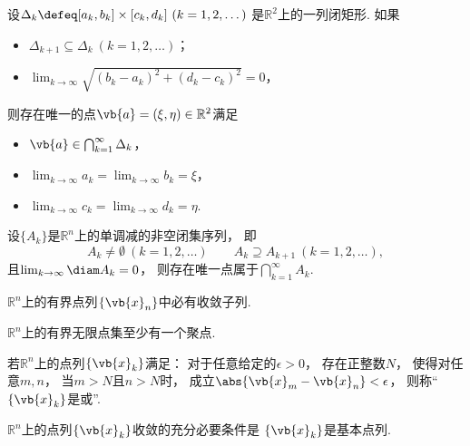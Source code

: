 \begin{theorem}[闭矩形套定理]
设\(\Delta_k \defeq [a_k,b_k]\times[c_k,d_k]\ (k=1,2,\dotsc)\)
是\(\mathbb{R}^2\)上的一列闭矩形.
如果\begin{itemize}
	\item \(\Delta_{k+1} \subseteq \Delta_k\ (k=1,2,\dotsc)\)；
	\item \(\lim_{k\to\infty} \sqrt{(b_k-a_k)^2+(d_k-c_k)^2} = 0\)，
\end{itemize}
则存在唯一的点\(\vb{a}=(\xi,\eta)\in\mathbb{R}^2\)满足\begin{itemize}
	\item \(\vb{a}\in\bigcap_{k=1}^\infty \Delta_k\)，
	\item \(\lim_{k\to\infty} a_k = \lim_{k\to\infty} b_k = \xi\)，
	\item \(\lim_{k\to\infty} c_k = \lim_{k\to\infty} d_k = \eta\).
\end{itemize}
\end{theorem}
\begin{theorem}
设\(\{A_k\}\)是\(\mathbb{R}^n\)上的单调减的非空闭集序列，
即\begin{equation*}
	A_k\neq\emptyset\ (k=1,2,\dotsc)
	\qquad
	A_k \supseteq A_{k+1}\ (k=1,2,\dotsc),
\end{equation*}
且\(\lim_{k\to\infty} \diam A_k = 0\)，
则存在唯一点属于\(\bigcap_{k=1}^\infty A_k\).
\end{theorem}

\begin{theorem}
\(\mathbb{R}^n\)上的有界点列\(\{\vb{x}_n\}\)中必有收敛子列.
\end{theorem}
\begin{corollary}
\(\mathbb{R}^n\)上的有界无限点集至少有一个聚点.
\end{corollary}
\begin{definition}
若\(\mathbb{R}^n\)上的点列\(\{\vb{x}_k\}\)满足：
对于任意给定的\(\epsilon>0\)，
存在正整数\(N\)，
使得对任意\(m,n\)，
当\(m>N\)且\(n>N\)时，
成立\(\abs{\vb{x}_m-\vb{x}_n}<\epsilon\)，
则称“\(\{\vb{x}_k\}\)是或”.
\end{definition}
\begin{theorem}
\(\mathbb{R}^n\)上的点列\(\{\vb{x}_k\}\)收敛的充分必要条件是
\(\{\vb{x}_k\}\)是基本点列.
\end{theorem}

